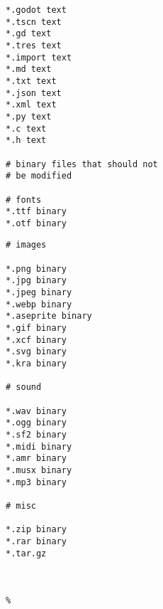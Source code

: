 \begin{itemize}[label=-]
\begin{minipage}{.45\textwidth}
\begin{lstlisting}
*.godot text
*.tscn text
*.gd text
*.tres text
*.import text
*.md text
*.txt text
*.json text
*.xml text
*.py text
*.c text
*.h text

# binary files that should not
# be modified

# fonts
*.ttf binary
*.otf binary
\end{lstlisting}
\end{minipage}\hfill
\begin{minipage}{.45\textwidth}
\begin{lstlisting}[escapechar=\%]
# images

*.png binary
*.jpg binary
*.jpeg binary
*.webp binary
*.aseprite binary
*.gif binary
*.xcf binary
*.svg binary
*.kra binary

# sound

*.wav binary
*.ogg binary
*.sf2 binary
*.midi binary
*.amr binary
*.musx binary
*.mp3 binary

# misc

*.zip binary
*.rar binary
*.tar.gz



%
\end{lstlisting}
\end{minipage}

\end{itemize}
